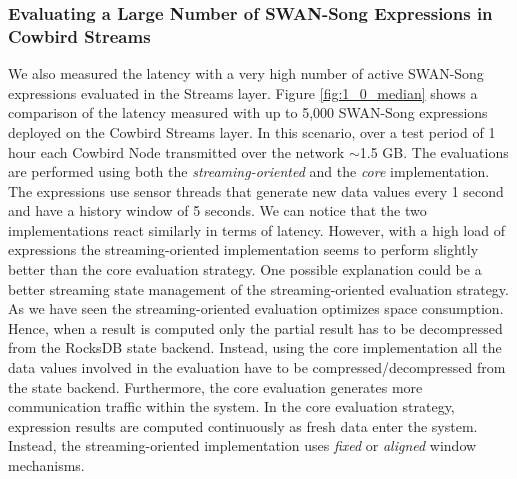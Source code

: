 \subsubsection{Evaluating a Large Number of SWAN-Song Expressions in Cowbird Streams}
We also measured the latency with a very high number of active SWAN-Song expressions evaluated in the Streams layer. Figure \ref{fig:1_0_median} shows a comparison of the latency measured with up to 5,000 SWAN-Song expressions deployed on the Cowbird Streams layer. In this scenario, over a test period of 1 hour each Cowbird Node transmitted over the network $\sim$1.5 GB. The evaluations are performed using both the \emph{streaming-oriented} and the \emph{core} implementation. The expressions use sensor threads that generate new data values every 1 second and have a history window of 5 seconds. We can notice that the two implementations react similarly in terms of latency. However, with a high load of expressions the streaming-oriented implementation seems to perform slightly better than the core evaluation strategy. One possible explanation could be a better streaming state management of the streaming-oriented evaluation strategy. As we have seen the streaming-oriented evaluation optimizes space consumption. Hence, when a result is computed only the partial result has to be decompressed from the RocksDB state backend. Instead, using the  core implementation all the data values involved in the evaluation have to be compressed/decompressed from the state backend. Furthermore, the core evaluation generates more communication traffic within the system. In the core evaluation strategy, expression results are computed continuously as fresh data enter the system. Instead, the streaming-oriented implementation uses \emph{fixed} or \emph{aligned} window mechanisms. 

